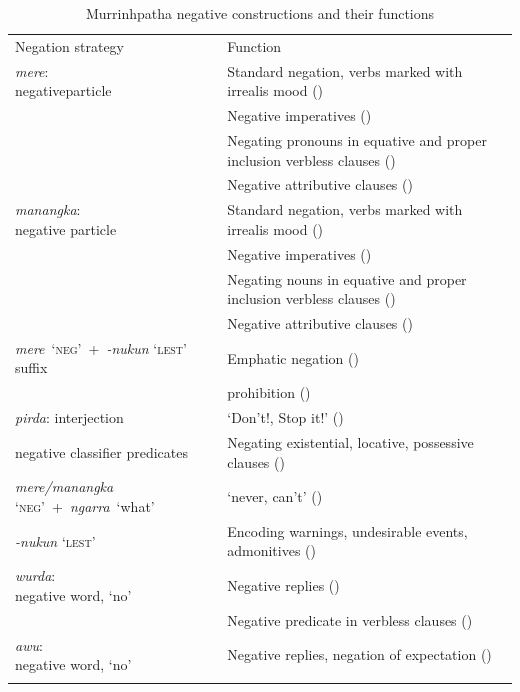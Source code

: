 \documentclass[output=paper,colorlinks,citecolor=brown]{langscibook}
\begin{document}
\begin{table}
\begin{tabularx}{\textwidth}{p{3cm}Q}
\lsptoprule
{Negation strategy} & {Function} \\
\midrule 
 {\textit{mere}:\newline  negativeparticle} & Standard negation, verbs marked with irrealis mood ()\\
\tablevspace
& Negative imperatives ()\\
\tablevspace
& Negating pronouns in equative and proper inclusion verbless clauses ()\\
\tablevspace
& Negative attributive clauses ()\\
\midrule 
 {\textit{manangka}:\newline negative particle} & Standard negation, verbs marked with irrealis mood ()\\
\tablevspace
& Negative imperatives ()\\
\tablevspace
& Negating nouns in equative and proper inclusion verbless clauses ()\\
\tablevspace
& Negative attributive clauses ()\\
\midrule 
 \mbox{{\textit{mere} ‘\textsc{neg}’ + \textit{{}-nukun}}} ‘\textsc{lest}’ suffix & Emphatic negation ()\\
& prohibition ()\\
\midrule 
{\textit{pirda}: interjection} & {‘Don’t!, Stop it!’ (})\\
\tablevspace
{negative classifier predicates} & Negating existential, locative, possessive clauses ()\\
\tablevspace
{\textit{mere/manangka} \mbox{‘\textsc{neg}’ + \textit{ngarra} ‘what’}} & {‘never, can’t’ (})\\
\tablevspace
{\textit{{}-nukun} ‘\textsc{lest}’} & Encoding warnings, undesirable events, admonitives ()\\
\midrule 
 {\textit{wurda}:\newline  negative word, ‘no’} & Negative replies ()\\
& Negative predicate in verbless clauses ()\\
\midrule 
{\textit{awu}:\newline  negative word, ‘no’} & {Negative replies, negation of expectation (})\\
\lspbottomrule
\end{tabularx}
    \caption{Murrinhpatha negative constructions and their functions}
    \label{tab:mur:3}
\end{table}
\end{document}
